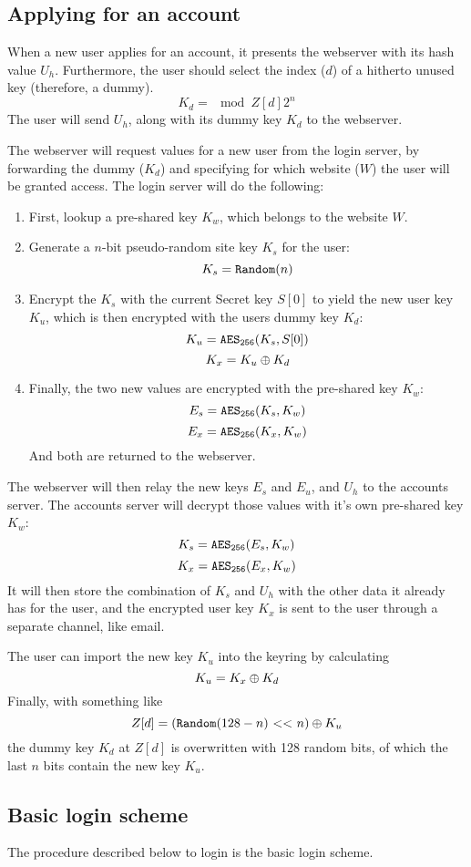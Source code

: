 \subsection{Applying for an account}
\label{sec:applying}
When a new user applies for an account,
it presents the webserver with its hash value $U_h$.
Furthermore,
the user should select the index ($d$) of a hitherto unused key
(therefore, a dummy).
\[K_d=\mod{Z[d]}{2^n}\]
The user will send $U_h$, along with its dummy key $K_d$ to the webserver.
\par
The webserver will request values for a new user from the login server,
by forwarding the dummy ($K_d$) and
specifying for which website ($W$) the user will be granted access.
The login server will do the following:
\begin{enumerate}
\item First,
	lookup a pre-shared key $K_w$,
	which belongs to the website $W$.
\item Generate a $n$-bit pseudo-random site key $K_s$ for the user:
\[K_s=\texttt{Random}(n)\]
\item Encrypt the $K_s$ with the current Secret key $S[0]$ to yield the new user key $K_u$,
which is then encrypted with the users dummy key $K_d$:
\[K_u=\texttt{\ensuremath{\mathtt{AES_{256}}}}(K_s, S[0])\]
\[K_x=K_u\oplus K_d\]
\item Finally, the two new values are encrypted with the pre-shared key $K_w$:
\[E_s=\texttt{\ensuremath{\mathtt{AES_{256}}}}(K_s, K_w)\]
\[E_x=\texttt{\ensuremath{\mathtt{AES_{256}}}}(K_x, K_w)\]
And both are returned to the webserver.
\end{enumerate}
The webserver will then relay the new keys $E_s$ and $E_u$, and $U_h$ to the accounts server.
The accounts server will decrypt those values with it's own pre-shared key $K_w$:
\[K_s=\texttt{\ensuremath{\mathtt{AES_{256}}}}(E_s, K_w)\]
\[K_x=\texttt{\ensuremath{\mathtt{AES_{256}}}}(E_x, K_w)\]
It will then store the combination of $K_s$ and $U_h$ with the other data it already has for the user,
and the encrypted user key $K_x$ is sent to the user through a separate channel,
like email.
\par
The user can import the new key $K_u$ into the keyring by calculating
\[K_u=K_x\oplus K_d\]
Finally, with something like
\[Z[d]=\xor{(\F{Random}{128-n}\ \mathbf{<<}\ n)}{K_u}\]
the dummy key $K_d$ at $Z[d]$ is overwritten with 128 random bits,
of which the last $n$ bits contain the new key $K_u$.

\subsection{Basic login scheme}
\label{sec:basic_login}
The procedure described below to login is the basic login scheme.

